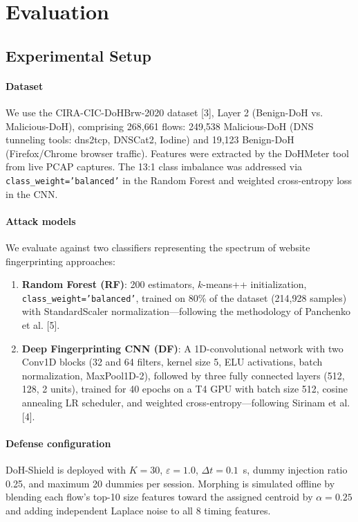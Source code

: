 \documentclass[conference]{IEEEtran}
\begin{document}
\section{Evaluation}\label{sec:evaluation}

\subsection{Experimental Setup}

\paragraph{Dataset} We use the CIRA-CIC-DoHBrw-2020 dataset [3], Layer 2 (Benign-DoH vs. Malicious-DoH), comprising 268,661 flows: 249,538 Malicious-DoH (DNS tunneling tools: dns2tcp, DNSCat2, Iodine) and 19,123 Benign-DoH (Firefox/Chrome browser traffic). Features were extracted by the DoHMeter tool from live PCAP captures. The 13:1 class imbalance was addressed via \texttt{class\_weight='balanced'} in the Random Forest and weighted cross-entropy loss in the CNN.

\paragraph{Attack models} We evaluate against two classifiers representing the spectrum of website fingerprinting approaches:
\begin{enumerate}
    \item \textbf{Random Forest (RF)}: 200 estimators, $k$-means++ initialization, \texttt{class\_weight='balanced'}, trained on 80\% of the dataset (214,928 samples) with StandardScaler normalization---following the methodology of Panchenko et al. [5].
    \item \textbf{Deep Fingerprinting CNN (DF)}: A 1D-convolutional network with two Conv1D blocks (32 and 64 filters, kernel size 5, ELU activations, batch normalization, MaxPool1D-2), followed by three fully connected layers (512, 128, 2 units), trained for 40 epochs on a T4 GPU with batch size 512, cosine annealing LR scheduler, and weighted cross-entropy---following Sirinam et al. [4].
\end{enumerate}

\paragraph{Defense configuration} DoH-Shield is deployed with $K=30$, $\varepsilon=1.0$, $\Delta t=0.1$~s, dummy injection ratio 0.25, and maximum 20 dummies per session. Morphing is simulated offline by blending each flow's top-10 size features toward the assigned centroid by $\alpha=0.25$ and adding independent Laplace noise to all 8 timing features.
\end{document}

